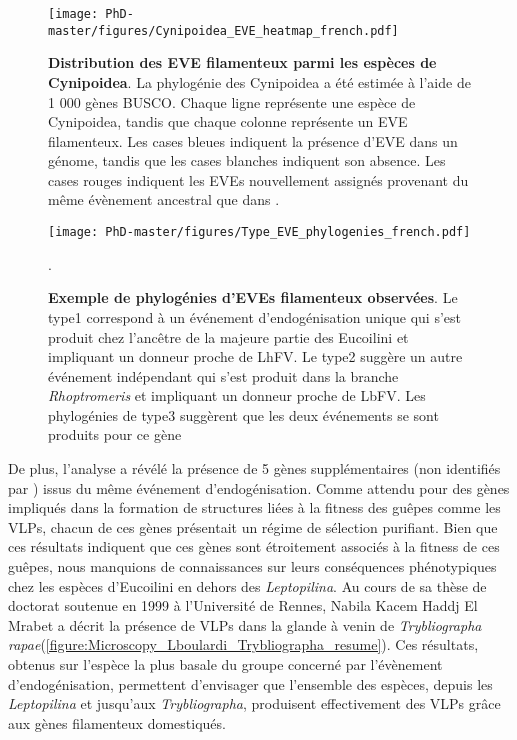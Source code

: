 \begin{figure}[!htpbt]
\texttt{[image: PhD-master/figures/Cynipoidea\_EVE\_heatmap\_french.pdf]}\centering
\caption[Paper3:Distribution des EVE filamenteux parmi les espèces de Cynipoidea]{\textbf{Distribution des EVE filamenteux parmi les espèces de Cynipoidea}. La phylogénie des Cynipoidea a été estimée à l'aide de 1 000 gènes BUSCO. Chaque ligne représente une espèce de Cynipoidea, tandis que chaque colonne représente un EVE filamenteux.
Les cases bleues indiquent la présence d'EVE dans un génome, tandis que les cases blanches indiquent son absence. Les cases rouges indiquent les EVEs nouvellement assignés provenant du même évènement ancestral que dans \cite{di_giovanni_behavior-manipulating_2020}.}
\label{figure:Cynipoidea_EVE_heatmap_french}
\end{figure}


\begin{figure}[!htpbt]
\texttt{[image: PhD-master/figures/Type\_EVE\_phylogenies\_french.pdf]}\centering
\caption[Paper3:Type de phylogenies d'EVEs filamenteux chez les Eucoilini]{\textbf{Exemple de phylogénies d'EVEs filamenteux observées}. Le type1 correspond à un événement d'endogénisation unique qui s'est produit chez l'ancêtre de la majeure partie des Eucoilini et impliquant un donneur proche de LhFV. Le type2 suggère un autre événement indépendant qui s'est produit dans la branche \textit{Rhoptromeris} et impliquant un donneur proche de LbFV. Les phylogénies de type3 suggèrent que les deux événements se sont produits pour ce gène}.
\label{figure:Type_EVE_phylogenies_french}
\end{figure}

De plus, l'analyse a révélé la présence de 5 gènes supplémentaires (non identifiés par \cite{di_giovanni_behavior-manipulating_2020}) issus du même événement d'endogénisation. Comme attendu pour des gènes impliqués dans la formation de structures liées à la fitness des guêpes comme les VLPs, chacun de ces gènes présentait un régime de sélection purifiant. Bien que ces résultats indiquent que ces gènes sont étroitement associés à la fitness de ces guêpes, nous manquions de connaissances sur leurs conséquences phénotypiques  chez les espèces d'Eucoilini en dehors des \textit{Leptopilina}. Au cours de sa thèse de doctorat soutenue en 1999 à l'Université de Rennes, Nabila Kacem Haddj El Mrabet a décrit la présence de VLPs dans la glande à venin de \textit{Trybliographa rapae}(\figurename{\ref{figure:Microscopy_Lboulardi_Trybliographa_resume}}). Ces résultats, obtenus sur l'espèce la plus basale du groupe concerné par l'évènement d'endogénisation, permettent d'envisager que l'ensemble des espèces, depuis les \textit{Leptopilina} et jusqu'aux \textit{Trybliographa}, produisent effectivement des VLPs grâce aux gènes filamenteux domestiqués.\\

